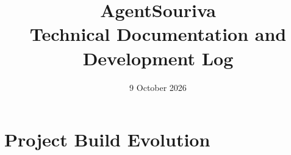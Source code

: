\documentclass[11pt,letterpaper]{article}
\title{AgentSouriva\\[0.25em]\large Technical Documentation and Development Log}
\author{}
\date{9 October 2026}
\begin{document}
\maketitle
\tableofcontents
\clearpage













\clearpage
\section{Project Build Evolution}





























\end{document}
